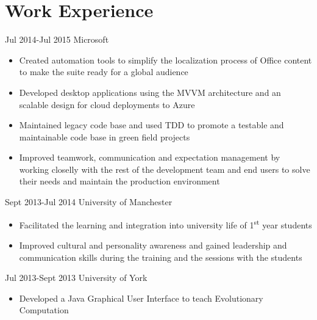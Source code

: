 \documentclass{CurriculumVitae}
\begin{document}
  \makeheading

  \section{Work Experience}
      {Jul 2014-Jul 2015}
      {Microsoft}
      {\begin{itemize}
        \vspace{-3mm}
         \item Created automation tools to simplify the localization process of Office content to make the suite ready for a global audience
         \item Developed desktop applications using the MVVM architecture and an scalable design for cloud deployments to Azure
         \item Maintained legacy code base and used TDD to promote a testable and maintainable code base in green field projects
         \item Improved teamwork, communication and expectation management by working closelly with the rest of the development team and end users to solve their needs and maintain the production environment
      \end{itemize}}
      {Sept 2013-Jul 2014}
      {University of Manchester}
      {\begin{itemize}
	\vspace{-3mm}
	 \item Facilitated the learning and integration into university life of 1\textsuperscript{st} year students
	 \item Improved cultural and personality awareness and gained leadership and communication skills during the training and the sessions with the students 
       \end{itemize}}
    
      {Jul 2013-Sept 2013}
      {University of York}
      {\begin{itemize}
	 \vspace{-3mm}
	  \item Developed a Java Graphical User Interface to teach Evolutionary Computation%
       \end{itemize}} 
  \vspace{-5mm}
\end{document}
